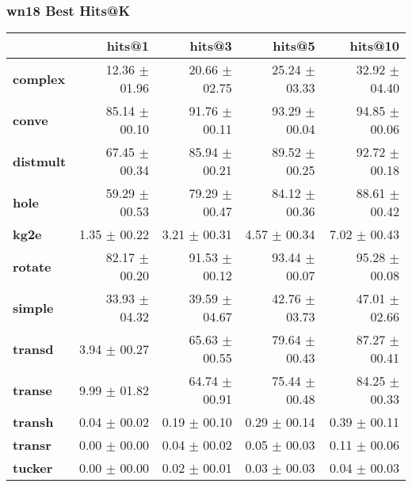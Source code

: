\documentclass{article}
\begin{document}
\subsubsection{wn18 Best Hits@K}
    \begin{center}
    \begin{tabular}{lrrrr}
\toprule
{} &         hits@1 &         hits@3 &         hits@5 &        hits@10 \\
\midrule
\textbf{complex } &  12.36 $\pm$ 01.96 &  20.66 $\pm$ 02.75 &  25.24 $\pm$ 03.33 &  32.92 $\pm$ 04.40 \\
\textbf{conve   } &  85.14 $\pm$ 00.10 &  91.76 $\pm$ 00.11 &  93.29 $\pm$ 00.04 &  94.85 $\pm$ 00.06 \\
\textbf{distmult} &  67.45 $\pm$ 00.34 &  85.94 $\pm$ 00.21 &  89.52 $\pm$ 00.25 &  92.72 $\pm$ 00.18 \\
\textbf{hole    } &  59.29 $\pm$ 00.53 &  79.29 $\pm$ 00.47 &  84.12 $\pm$ 00.36 &  88.61 $\pm$ 00.42 \\
\textbf{kg2e    } &   1.35 $\pm$ 00.22 &   3.21 $\pm$ 00.31 &   4.57 $\pm$ 00.34 &   7.02 $\pm$ 00.43 \\
\textbf{rotate  } &  82.17 $\pm$ 00.20 &  91.53 $\pm$ 00.12 &  93.44 $\pm$ 00.07 &  95.28 $\pm$ 00.08 \\
\textbf{simple  } &  33.93 $\pm$ 04.32 &  39.59 $\pm$ 04.67 &  42.76 $\pm$ 03.73 &  47.01 $\pm$ 02.66 \\
\textbf{transd  } &   3.94 $\pm$ 00.27 &  65.63 $\pm$ 00.55 &  79.64 $\pm$ 00.43 &  87.27 $\pm$ 00.41 \\
\textbf{transe  } &   9.99 $\pm$ 01.82 &  64.74 $\pm$ 00.91 &  75.44 $\pm$ 00.48 &  84.25 $\pm$ 00.33 \\
\textbf{transh  } &   0.04 $\pm$ 00.02 &   0.19 $\pm$ 00.10 &   0.29 $\pm$ 00.14 &   0.39 $\pm$ 00.11 \\
\textbf{transr  } &   0.00 $\pm$ 00.00 &   0.04 $\pm$ 00.02 &   0.05 $\pm$ 00.03 &   0.11 $\pm$ 00.06 \\
\textbf{tucker  } &   0.00 $\pm$ 00.00 &   0.02 $\pm$ 00.01 &   0.03 $\pm$ 00.03 &   0.04 $\pm$ 00.03 \\
\bottomrule
\end{tabular}

    \end{center}
\end{document}
